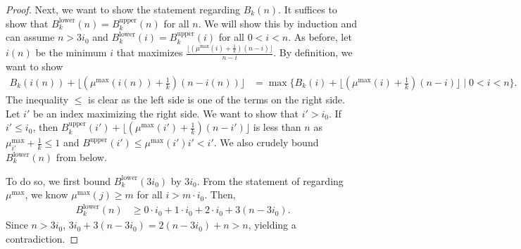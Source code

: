 \documentclass[11pt,reqno]{amsart}
\theoremstyle{plain}
\theoremstyle{definition}
\theoremstyle{remark}
\numberwithin{equation}{section}
\numberwithin{equation}{section}
\newcommand{\up}{\textrm{upper}}
\newcommand{\low}{\textrm{lower}}
\begin{document}
\begin{proof}
Next, we want to show the statement regarding $B_k(n)$. It suffices to show that $B_k^{\low}(n)=B_k^{\up}(n)$ for all $n$. We will show this by induction and can assume $n> 3i_0$ and $B_k^{\low}(i)=B_k^{\up}(i)$ for all $0<i<n$. As before, let $i(n)$ be the minimum $i$ that maximizes $\frac{\lfloor(\mu^{\max}(i)+\frac{1}{k})(n-i)\rfloor}{n-i}$.
By definition, we want to show
\begin{align}
\label{eq:Bkeq}
    B_k(i(n))+\lfloor(\mu^{\max}(i(n))+\frac{1}{k})(n-i(n))\rfloor&= \max\{B_k(i)+\lfloor(\mu^{\max}(i)+\frac{1}{k})(n-i)\rfloor\mid 0<i<n\}.
\end{align}
The inequality $\leq$ is clear as the left side is one of the terms on the right side. Let $i'$ be an index maximizing the right side. We want to show that $i'> i_0$. If $i'\leq i_0$, then $B^{\up}_k(i')+\lfloor(\mu^{\max}(i')+\frac{1}{k})(n-i')\rfloor$ is less than $n$ as $\mu^{\max}_{i'}+\frac{1}{k}\leq 1$ and $B^{\up}(i')\leq \mu^{\max}(i')i'<i'$. We also crudely bound $B_k^{\low}(n)$ from below.

To do so, we first bound $B_k^{\low}(3i_0)$ by $3i_0$. From the statement of  regarding $\mu^{\max}$, we know $\mu^{\max}(j)\geq m$ for all $i>m\cdot i_0$. Then,
\begin{align*}
    B_k^{\low}(n)&\geq 0\cdot i_0+1\cdot i_0+2\cdot i_0+3(n-3i_0).
\end{align*}
 Since $n>3i_0$, $3i_0 + 3(n-3i_0)=2(n-3i_0)+n>n$, yielding a contradiction.


\end{proof}
\end{document}
